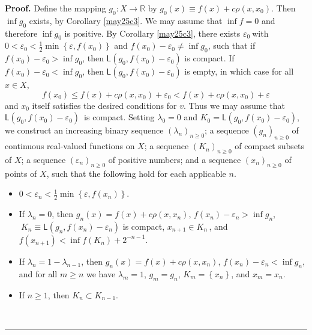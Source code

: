 \documentclass[11pt]{article}%
\newenvironment{proof}[1][Proof]{\noindent\textbf{#1.} }{\ \rule{0.5em}{0.5em}}
\begin{document}
\begin{proof}
Define the mapping $g_{0}:X\rightarrow\mathbb{R}$ by $g_{0}(x)\equiv
f(x)+c\rho(x,x_{0})$. Then $\inf g_{0}$ exists, by Corollary \ref{may25c3}. We
may assume that $\inf f=0$ and therefore $\inf g_{0}$ is positive. By
Corollary \ref{may25c3}, there exists $\varepsilon_{0}\ $with $0<\varepsilon
_{0}<\frac{1}{2}\min\left\{  \varepsilon,f(x_{0})\right\}  $ and
$f(x_{0})-\varepsilon_{0}\neq\inf g_{0}$, such that if $f(x_{0})-\varepsilon
_{0}>\inf g_{0}$, then $\mathsf{L}(g_{0},f(x_{0})-\varepsilon_{0})$ is
compact. If $f(x_{0})-\varepsilon_{0}<\inf g_{0}$, then $\mathsf{L}%
(g_{0},f(x_{0})-\varepsilon_{0})$ is empty, in which case for all $x\in X$,
\[
f(x_{0})\leqslant f(x)+c\rho(x,x_{0})+\varepsilon_{0}<f(x)+c\rho
(x,x_{0})+\varepsilon
\]
and $x_{0}$ itself satisfies the desired conditions for $v$. Thus we may
assume that $\mathsf{L}(g_{0},f(x_{0})-\varepsilon_{0})$\ is compact. Setting
$\lambda_{0}=0$ and $K_{0}=\mathsf{L}(g_{0},f(x_{0})-\varepsilon_{0})$, we
construct an increasing binary sequence $\left(  \lambda_{n}\right)
_{n\geqslant0}$; a sequence $\left(  g_{n}\right)  _{n\geqslant0} $ of
continuous real-valued functions on $X$; a sequence $\left(  K_{n}\right)
_{n\geqslant0}$ of compact subsets of $X$; a sequence $\left(  \varepsilon
_{n}\right)  _{n\geqslant0}$ of positive numbers; and a sequence $\left(
x_{n}\right)  _{n\geqslant0}$ of points of $X$, such that the following hold
for each applicable $n$.

\begin{itemize}
\item[(a)] $0<\varepsilon_{n}<\frac{1}{2}\min\left\{  \varepsilon
,f(x_{n})\right\}  $.

\item[(b)] If $\lambda_{n}=0$, then $g_{n}(x)=f(x)+c\rho(x,x_{n})$,
$f(x_{n})-\varepsilon_{n}>\inf g_{n}$,$\ K_{n}\equiv\mathsf{L}(g_{n}%
,f(x_{n})-\varepsilon_{n})$ is compact, $x_{n+1}\in K_{n}\,$, and
$f(x_{n+1})<\inf f(K_{n})+2^{-n-1}$.

\item[(c)] If $\lambda_{n}=1-\lambda_{n-1}$, then $g_{n}(x)=f(x)+c\rho
(x,x_{n})$, $f(x_{n})-\varepsilon_{n}<\inf g_{n}$, and for all $m\geqslant n $
we have $\lambda_{m}=1$, $g_{m}=g_{n}$, $K_{m}=\left\{  x_{n}\right\}  $, and
$x_{m}=x_{n}$.

\item[(d)] If $n\geqslant1$, then $K_{n}\subset K_{n-1}$.
\end{itemize}

%


\end{proof}
\end{document}

